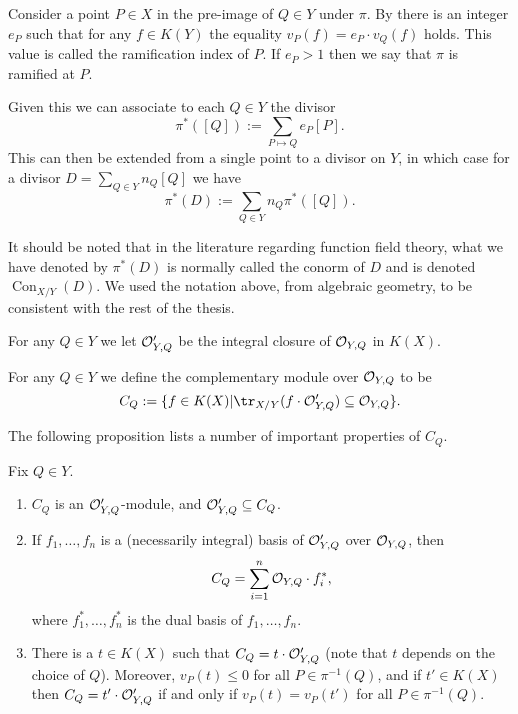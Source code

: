     \begin{defn}\label{definitionramificationdivisor}
    Consider a point $P\in X$ in the pre-image of $Q\in Y$ under $\pi$.
    By \cite[Prop. 3.1.4]{stichtenoth} there is an integer $e_P$ such that for any $f\in K(Y)$ the equality $v_P(f) = e_P\cdot v_Q(f)$ holds.
    This value is called the ramification index of $P$.
    If $e_P>1$ then we say that $\pi$ is ramified at $P$.
    \end{defn}

Given this we can associate to each $Q\in Y$ the divisor
    \[
    \pi^*([Q]) := \sum_{P\mapsto Q} e_P [P].
    \]
This can then be extended from a single point to a divisor on $Y$, in which case for a divisor $D = \sum_{Q\in Y}n_Q [Q]$ we have
    \[
    \pi^*(D) := \sum_{Q\in Y}n_Q \pi^*([Q]).
    \]

    \begin{rem}
    It should be noted that in the literature regarding function field theory, what we have denoted by $\pi^*(D)$ is normally called the conorm of $D$ and is denoted $\operatorname{Con}_{X/Y}(D)$. 
    We used the notation above, from algebraic geometry, to be consistent with the rest of the thesis.
    \end{rem}

    For any $Q\in Y$ we let ${\cal O}_{Y,Q}'$ be the integral closure of ${\cal O}_{Y,Q}$ in $K(X)$.

    \begin{defn}
    For any $Q \in Y$ we define the complementary module over ${\cal O}_{Y,Q}$ to be
        \[
        C_Q :=\{f\in K(X) | \tr_{X/Y}(f\cdot \cO_{Y,Q}') \subseteq \cO_{Y,Q}\}.
        \]
    \end{defn}


The following proposition lists a number of important properties of $C_Q$.

\begin{prop}\label{propfactsaboutc'}
    Fix $Q\in Y$. 
        \begin{enumerate}
        \item $C_Q$ is an ${\cal O}_{Y,Q}'$-module, and ${\cal O}_{Y,Q}' \subseteq C_Q$.
        \item If $f_1,\ldots ,f_n$ is a (necessarily integral) basis of ${\cal O}_{Y,Q}'$ over ${\cal O}_{Y,Q}$, then 
        \[
        C_Q = \sum_{i=1}^n {\cal O}_{Y,Q}\cdot f_i^*,
        \]
        where $f_1^*, \ldots, f_n^*$ is the dual basis of $f_1, \ldots, f_n$.
        \item There is a $t\in K(X)$ such that $C_Q = t\cdot {\cal O}_{Y,Q}'$ (note that $t$ depends on the choice of $Q$).
        Moreover, $v_P(t) \leq 0$ for all $P\in \pi^{-1}(Q)$, and if $t'\in K(X)$ then $C_Q=t'\cdot {\cal O}_{Y,Q}'$ if and only if $v_P(t) = v_P(t')$ for all $P\in \pi^{-1}(Q)$.
        \end{enumerate}
    \end{prop}

